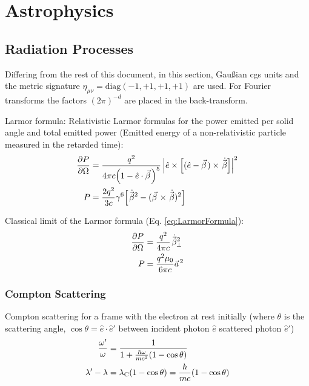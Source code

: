 \section{Astrophysics}
	\subsection{Radiation Processes}
		Differing from the rest of this document, in this section, Gaußian cgs units and the metric signature $\eta_{\mu\nu}=\mathrm{diag}(-1,+1,+1,+1)$ are used. For Fourier transforms the factors $(2\pi)^{-d}$ are placed in the back-transform.

		\noindent
		Larmor formula:
		Relativistic Larmor formulas for the power emitted per solid angle and total emitted power (Emitted energy of a non-relativistic particle measured in the retarded time):
		\begin{equation}
			\label{eq:LarmorFormula}
			\begin{aligned}
				\pdv{P}{\Omega} &= \frac{q^2}{4\pi c\qty(1-\hat{e}\cdot\vec{\beta})^5} \left| \hat{e}\times\qty[(\hat{e}-\vec{\beta}) \times \dot{\vec{\beta}}] \right|^2 \\
				P &= \frac{2q^2}{3c}\gamma^6\qty[\dot{\vec{\beta}}^2 - (\vec{\beta}\times\dot{\vec{\beta}})^2] \\
			\end{aligned}
		\end{equation}

		\noindent 
		Classical limit of the Larmor formula (Eq. \ref{eq:LarmorFormula}):
		\begin{equation}
			\begin{aligned}
				\pdv{P}{\Omega} &= \frac{q^2}{4\pi c}\dot{\vec{\beta}}_\perp^2 \\
				P &= \frac{q^2 \mu_0}{6\pi c}\vec{a}^2\\
			\end{aligned}
		\end{equation}
		
		\subsubsection{Compton Scattering}
			Compton scattering for a frame with the electron at rest initially (where $\theta$ is the scattering angle, $\cos\theta = \hat{e}\cdot\hat{e}'$ between incident photon $\hat{e}$ scattered photon $\hat{e}'$)
			\begin{equation}
				\begin{aligned}
					\frac{\omega'}{\omega} &= \frac{1}{1+\frac{\hbar\omega}{mc^2}\qty(1-\cos\theta)} \\
					\lambda' - \lambda &= \lambda_\mathrm{C}(1-\cos\theta) = \frac{h}{m c}(1-\cos\theta)
				\end{aligned}
			\end{equation}

